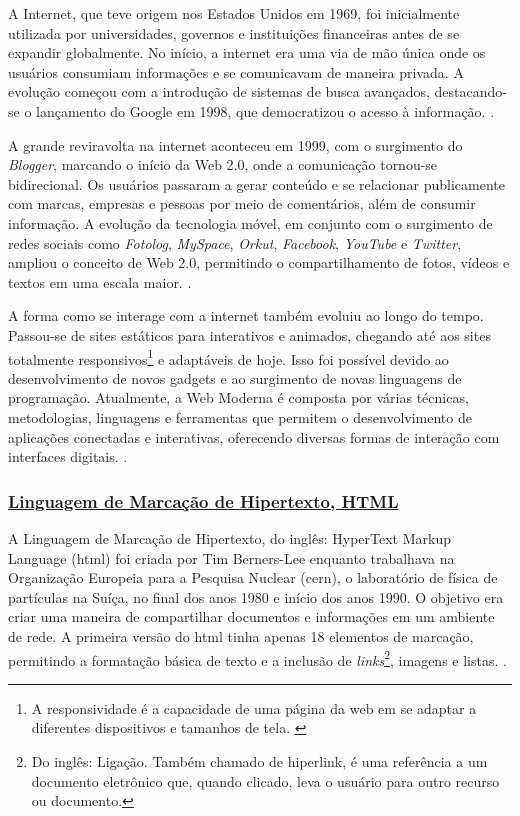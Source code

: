 A Internet, que teve origem nos Estados Unidos em 1969, foi inicialmente utilizada
por universidades, governos e instituições financeiras antes de se expandir globalmente. No
início, a internet era uma via de mão única onde os usuários consumiam informações e se
comunicavam de maneira privada. A evolução começou com a introdução de sistemas de
busca avançados, destacando-se o lançamento do Google em 1998, que democratizou o
acesso à informação.
\cite{vitoriano}.

A grande reviravolta na internet aconteceu em 1999, com o surgimento do
\textit{Blogger},
marcando o início da
Web
2.0, onde a comunicação tornou-se bidirecional. Os usuários
passaram a gerar conteúdo e se relacionar publicamente com marcas, empresas e pessoas por
meio de comentários, além de consumir informação. A evolução da tecnologia móvel, em
conjunto com o surgimento de redes sociais como
\textit{Fotolog},
\textit{MySpace},
\textit{Orkut},
\textit{Facebook},
\textit{YouTube}
e
\textit{Twitter},
ampliou o conceito de Web 2.0, permitindo o compartilhamento de fotos,
vídeos e textos em uma escala maior.
\cite{vitoriano}.

A forma como se interage com a internet também evoluiu ao longo do tempo.
Passou-se de sites estáticos para interativos e animados, chegando até aos sites totalmente
responsivos\footnote{A responsividade é a capacidade de uma página da
    \acrshort{web}
    em se adaptar a diferentes dispositivos e tamanhos de tela.
    \cite{responsivo}
}
e adaptáveis de hoje. Isso foi possível devido ao desenvolvimento de novos
gadgets e ao surgimento de novas linguagens de programação. Atualmente, a Web Moderna é
composta por várias técnicas, metodologias, linguagens e ferramentas que permitem o
desenvolvimento de aplicações conectadas e interativas, oferecendo diversas formas de
interação com interfaces digitais.
\cite{vitoriano}.

\subsubsection{\underline{Linguagem de Marcação de Hipertexto, HTML}}

A Linguagem de Marcação de Hipertexto, do inglês: HyperText Markup Language
(\acrshort{html})
foi criada por Tim Berners-Lee enquanto trabalhava na Organização Europeia para a
Pesquisa Nuclear
(\acrshort{cern}),
o laboratório de física de partículas na Suíça, no final dos anos
1980 e início dos anos 1990. O objetivo era criar uma maneira de compartilhar documentos e
informações em um ambiente de rede. A primeira versão do
\acrshort{html}
tinha apenas 18 elementos
de marcação, permitindo a formatação básica de texto e a inclusão de
\textit{links}\footnote{Do inglês: Ligação. Também chamado de hiperlink, é uma referência a um
    documento eletrônico que, quando clicado, leva o usuário para outro recurso
    ou documento.
},
imagens e listas.
\cite{w3c}.

